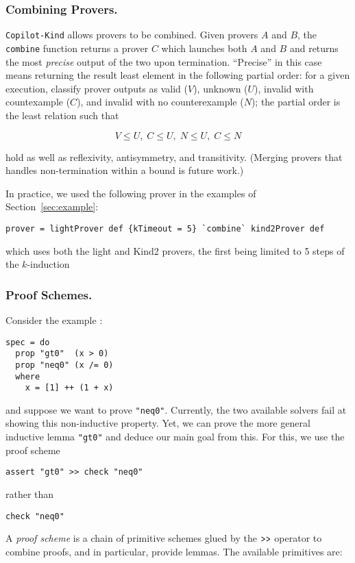 \subsubsection{Combining Provers.}\label{combining-provers}
\texttt{Copilot-Kind} allows provers to be combined. Given provers $A$ and $B$,
the \texttt{combine} function returns a prover $C$ which launches both $A$ and
$B$ and returns the most \emph{precise} output of the two upon
termination. ``Precise'' in this case means returning the result least element
in the following partial order: for a given execution, classify prover outputs
as valid ($V$), unknown ($U$), invalid with countexample ($C$), and invalid with
no counterexample ($N$); the partial order is the least relation such that

$$V \leq U, \; C \leq U, \; N \leq U, \; C \leq N$$

\noindent
hold as well as reflexivity, antisymmetry, and transitivity. (Merging provers
that handles non-termination within a bound is future work.)

In practice, we used the following prover in the examples of Section~\ref{sec:example}:
\begin{lstlisting}[frame=single]
prover = lightProver def {kTimeout = 5} `combine` kind2Prover def
\end{lstlisting}
which uses both the light and Kind2 provers, the first being limited to 5 steps of the $k$-induction 

\subsubsection{Proof Schemes.}\label{proof-schemes}

Consider the example :
\begin{lstlisting}[frame=single]
spec = do
  prop "gt0"  (x > 0)
  prop "neq0" (x /= 0)
  where
    x = [1] ++ (1 + x)

\end{lstlisting}
and suppose we want to prove \texttt{"neq0"}. Currently, the two available solvers fail at showing this non-inductive property. Yet, we can prove the more general
inductive lemma \texttt{"gt0"} and deduce our main goal from this. For
this, we use the proof scheme

\begin{lstlisting}[frame=single]
assert "gt0" >> check "neq0"
\end{lstlisting}

\noindent
rather than
\begin{lstlisting}[frame=single] 
check "neq0" 
\end{lstlisting}
A \emph{proof scheme} is a chain of
primitive schemes glued by the $\texttt{\textgreater{}\textgreater{}}$
operator to combine proofs, and in particular, provide lemmas. The available primitives are:


